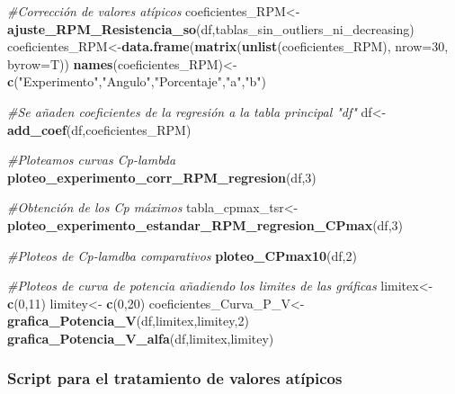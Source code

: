 \documentclass[]{article}
\newenvironment{Shaded}{\begin{snugshade}}{\end{snugshade}}
\newcommand{\KeywordTok}[1]{\textcolor[rgb]{0.13,0.29,0.53}{\textbf{#1}}}
\newcommand{\DataTypeTok}[1]{\textcolor[rgb]{0.13,0.29,0.53}{#1}}
\newcommand{\DecValTok}[1]{\textcolor[rgb]{0.00,0.00,0.81}{#1}}
\newcommand{\StringTok}[1]{\textcolor[rgb]{0.31,0.60,0.02}{#1}}
\newcommand{\CommentTok}[1]{\textcolor[rgb]{0.56,0.35,0.01}{\textit{#1}}}
\newcommand{\NormalTok}[1]{#1}
\begin{document}
\begin{Shaded}
\begin{Highlighting}[]
\CommentTok{#Corrección de valores atípicos}
\NormalTok{coeficientes_RPM<-}\KeywordTok{ajuste_RPM_Resistencia_so}\NormalTok{(df,tablas_sin_outliers_ni_decreasing)}
\NormalTok{coeficientes_RPM<-}\KeywordTok{data.frame}\NormalTok{(}\KeywordTok{matrix}\NormalTok{(}\KeywordTok{unlist}\NormalTok{(coeficientes_RPM), }\DataTypeTok{nrow=}\DecValTok{30}\NormalTok{, }\DataTypeTok{byrow=}\NormalTok{T))}
\KeywordTok{names}\NormalTok{(coeficientes_RPM)<-}\StringTok{ }\KeywordTok{c}\NormalTok{(}\StringTok{"Experimento"}\NormalTok{,}\StringTok{"Angulo"}\NormalTok{,}\StringTok{"Porcentaje"}\NormalTok{,}\StringTok{"a"}\NormalTok{,}\StringTok{"b"}\NormalTok{)}


\CommentTok{#Se añaden coeficientes de la regresión a la tabla principal "df"}
\NormalTok{df<-}\KeywordTok{add_coef}\NormalTok{(df,coeficientes_RPM)}



\CommentTok{#Ploteamos curvas Cp-lambda}
\KeywordTok{ploteo_experimento_corr_RPM_regresion}\NormalTok{(df,}\DecValTok{3}\NormalTok{)}

\CommentTok{#Obtención de los Cp máximos}
\NormalTok{tabla_cpmax_tsr<-}\KeywordTok{ploteo_experimento_estandar_RPM_regresion_CPmax}\NormalTok{(df,}\DecValTok{3}\NormalTok{)}

\CommentTok{#Ploteos de Cp-lamdba comparativos}
\KeywordTok{ploteo_CPmax10}\NormalTok{(df,}\DecValTok{2}\NormalTok{)}

\CommentTok{#Ploteos de curva de potencia añadiendo los limites de las gráficas}
\NormalTok{limitex<-}\StringTok{ }\KeywordTok{c}\NormalTok{(}\DecValTok{0}\NormalTok{,}\DecValTok{11}\NormalTok{)}
\NormalTok{limitey<-}\StringTok{ }\KeywordTok{c}\NormalTok{(}\DecValTok{0}\NormalTok{,}\DecValTok{20}\NormalTok{)}
\NormalTok{coeficientes_Curva_P_V<-}\StringTok{ }\KeywordTok{grafica_Potencia_V}\NormalTok{(df,limitex,limitey,}\DecValTok{2}\NormalTok{)}
\KeywordTok{grafica_Potencia_V_alfa}\NormalTok{(df,limitex,limitey)}
\end{Highlighting}
\end{Shaded}

\subsubsection{Script para el tratamiento de valores
atípicos}\label{script-para-el-tratamiento-de-valores-atipicos}
\end{document}
